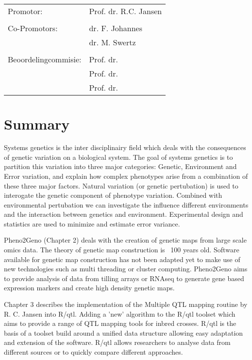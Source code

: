 \documentclass[8pt, twoside]{book}
\begin{document}
\newpage
\thispagestyle{empty}
\begin{tabular}{ l l }
Promotor:             & Prof. dr. R.C. Jansen \\
                      & \\
Co-Promotors:         & dr. F. Johannes \\
                      & dr. M. Swertz \\
                      & \\
Beoordelingcommisie:  & Prof. dr. \\
                      & Prof. dr. \\
                      & Prof. dr. \\
\end{tabular}
\tableofcontents

\newpage
\thispagestyle{empty}
\chapter*{Summary}\vspace{-30pt}
Systems genetics is the inter disciplinairy field which deals with the consequences of genetic 
variation on a biological system. The goal of systems genetics is to partition this variation 
into three major categories: Genetic, Environment and Error variation, and explain how complex
phenotypes arise from a combination of these three major factors.  Natural variation (or 
genetic pertubation) is used to interogate the genetic component of phenotype variation. 
Combined with environmental pertubation we can investigate the influence different 
environments and the interaction between genetics and environment. Experimental design and 
statistics are used to minimize and estimate error variance.

Pheno2Geno (Chapter 2) deals with the creation of genetic maps from large scale omics data. 
The theory of genetic map construction is ~100 years old. Software available for genetic map 
construction has not been adapted yet to make use of new technologies such as multi threading 
or cluster computing. Pheno2Geno aims to provide analysis of data from tilling arrays or RNAseq 
to generate gene based expression markers and create high density genetic maps.

Chapter 3 describes the implementation of the Multiple QTL mapping routine by R. C. Jansen into 
R/qtl. Adding a 'new' algorithm to the R/qtl toolset which aims to provide a range of QTL 
mapping tools for inbred crosses. R/qtl is the basis of a toolset build around a unified 
data structure allowing easy adaptation and extension of the software. R/qtl allows researchers 
to analyse data from different sources or to quickly compare different approaches.
\end{document}
